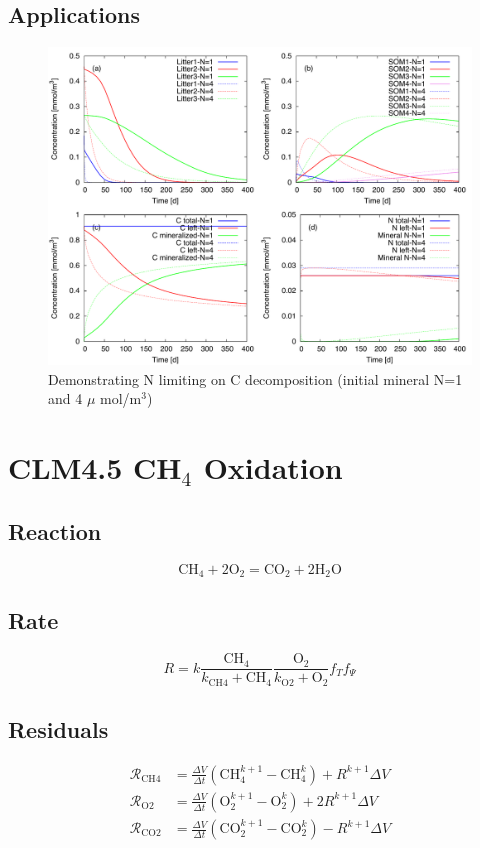\documentclass[12pt, a4paper]{article}
\begin{document}
\subsection{Applications}
\begin{figure}[h]
\centering
\includegraphics[width=1.0\textwidth]{../CLM-CN/comp.pdf}
\caption{Demonstrating N limiting on C decomposition (initial mineral N=1 and 4 $\mu$ mol/m$^3$)}
\label{Fig2}
\end{figure}

\clearpage
\section{CLM4.5 CH$_4$ Oxidation}
\subsection{Reaction}
\begin{equation}
\label{rxnclm45ch4o}
\text{CH}_4 + 2 \text{O}_2 =  \text{CO}_2 + 2 \text{H}_2\text{O}
\end{equation}

\subsection{Rate}
\begin{equation}
\label{clm45ch4orate}
R =  k \frac{\text{CH}_4}{k_\text{CH4} + \text{CH}_4} \frac{\text{O}_2}{k_\text{O2} + \text{O}_2} f_T f_\Psi
\end{equation}

\subsection{Residuals}
\begin{align*}
\mathcal{R}_{\text{CH4}} & = \frac{\Delta V}{\Delta t} \left(\text{CH}_4^{k+1} - \text{CH}_4^k\right)  + R^{k+1} \Delta V \\
\mathcal{R}_{\text{O2}} & = \frac{\Delta V}{\Delta t} \left(\text{O}_2^{k+1} - \text{O}_2^k\right)  + 2 R^{k+1} \Delta V \\
\mathcal{R}_{\text{CO2}} & = \frac{\Delta V}{\Delta t} \left(\text{CO}_2^{k+1} - \text{CO}_2^k\right)  - R^{k+1} \Delta V \\
\end{align*}
\end{document}
